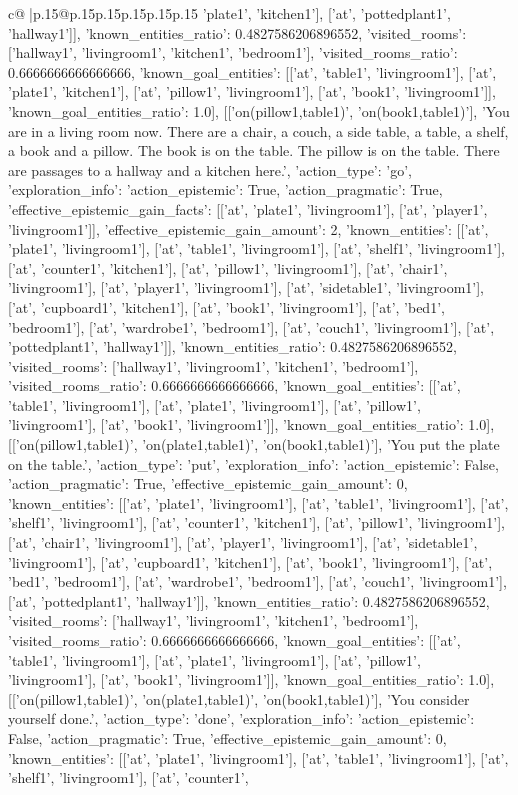 \documentclass{article}
\begin{document}
{\begin{supertabular}{c@{$\;$}|p{.15\linewidth}@{}p{.15\linewidth}p{.15\linewidth}p{.15\linewidth}p{.15\linewidth}p{.15\linewidth}}
{{{'plate1', 'kitchen1'], ['at', 'pottedplant1', 'hallway1']], 'known_entities_ratio': 0.4827586206896552, 'visited_rooms': ['hallway1', 'livingroom1', 'kitchen1', 'bedroom1'], 'visited_rooms_ratio': 0.6666666666666666, 'known_goal_entities': [['at', 'table1', 'livingroom1'], ['at', 'plate1', 'kitchen1'], ['at', 'pillow1', 'livingroom1'], ['at', 'book1', 'livingroom1']], 'known_goal_entities_ratio': 1.0}}], [['on(pillow1,table1)', 'on(book1,table1)'], 'You are in a living room now. There are a chair, a couch, a side table, a table, a shelf, a book and a pillow. The book is on the table. The pillow is on the table. There are passages to a hallway and a kitchen here.\n', {'action_type': 'go', 'exploration_info': {'action_epistemic': True, 'action_pragmatic': True, 'effective_epistemic_gain_facts': [['at', 'plate1', 'livingroom1'], ['at', 'player1', 'livingroom1']], 'effective_epistemic_gain_amount': 2, 'known_entities': [['at', 'plate1', 'livingroom1'], ['at', 'table1', 'livingroom1'], ['at', 'shelf1', 'livingroom1'], ['at', 'counter1', 'kitchen1'], ['at', 'pillow1', 'livingroom1'], ['at', 'chair1', 'livingroom1'], ['at', 'player1', 'livingroom1'], ['at', 'sidetable1', 'livingroom1'], ['at', 'cupboard1', 'kitchen1'], ['at', 'book1', 'livingroom1'], ['at', 'bed1', 'bedroom1'], ['at', 'wardrobe1', 'bedroom1'], ['at', 'couch1', 'livingroom1'], ['at', 'pottedplant1', 'hallway1']], 'known_entities_ratio': 0.4827586206896552, 'visited_rooms': ['hallway1', 'livingroom1', 'kitchen1', 'bedroom1'], 'visited_rooms_ratio': 0.6666666666666666, 'known_goal_entities': [['at', 'table1', 'livingroom1'], ['at', 'plate1', 'livingroom1'], ['at', 'pillow1', 'livingroom1'], ['at', 'book1', 'livingroom1']], 'known_goal_entities_ratio': 1.0}}], [['on(pillow1,table1)', 'on(plate1,table1)', 'on(book1,table1)'], 'You put the plate on the table.\n', {'action_type': 'put', 'exploration_info': {'action_epistemic': False, 'action_pragmatic': True, 'effective_epistemic_gain_amount': 0, 'known_entities': [['at', 'plate1', 'livingroom1'], ['at', 'table1', 'livingroom1'], ['at', 'shelf1', 'livingroom1'], ['at', 'counter1', 'kitchen1'], ['at', 'pillow1', 'livingroom1'], ['at', 'chair1', 'livingroom1'], ['at', 'player1', 'livingroom1'], ['at', 'sidetable1', 'livingroom1'], ['at', 'cupboard1', 'kitchen1'], ['at', 'book1', 'livingroom1'], ['at', 'bed1', 'bedroom1'], ['at', 'wardrobe1', 'bedroom1'], ['at', 'couch1', 'livingroom1'], ['at', 'pottedplant1', 'hallway1']], 'known_entities_ratio': 0.4827586206896552, 'visited_rooms': ['hallway1', 'livingroom1', 'kitchen1', 'bedroom1'], 'visited_rooms_ratio': 0.6666666666666666, 'known_goal_entities': [['at', 'table1', 'livingroom1'], ['at', 'plate1', 'livingroom1'], ['at', 'pillow1', 'livingroom1'], ['at', 'book1', 'livingroom1']], 'known_goal_entities_ratio': 1.0}}], [['on(pillow1,table1)', 'on(plate1,table1)', 'on(book1,table1)'], 'You consider yourself done.\n', {'action_type': 'done', 'exploration_info': {'action_epistemic': False, 'action_pragmatic': True, 'effective_epistemic_gain_amount': 0, 'known_entities': [['at', 'plate1', 'livingroom1'], ['at', 'table1', 'livingroom1'], ['at', 'shelf1', 'livingroom1'], ['at', 'counter1', }}}
\end{supertabular}}
\end{document}
